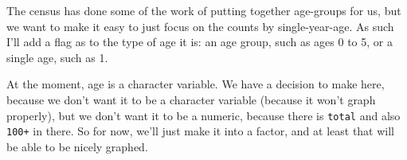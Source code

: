 \documentclass[
]{book}
\newenvironment{Shaded}{\begin{snugshade}}{\end{snugshade}}
\newcommand{\CommentTok}[1]{\textcolor[rgb]{0.56,0.35,0.01}{\textit{#1}}}
\newcommand{\KeywordTok}[1]{\textcolor[rgb]{0.13,0.29,0.53}{\textbf{#1}}}
\newcommand{\NormalTok}[1]{#1}
\newcommand{\OperatorTok}[1]{\textcolor[rgb]{0.81,0.36,0.00}{\textbf{#1}}}
\newcommand{\StringTok}[1]{\textcolor[rgb]{0.31,0.60,0.02}{#1}}
\begin{document}
\begin{Shaded}
\end{Shaded}

The census has done some of the work of putting together age-groups for us, but we want to make it easy to just focus on the counts by single-year-age. As such I'll add a flag as to the type of age it is: an age group, such as ages 0 to 5, or a single age, such as 1.

\begin{Shaded}
\end{Shaded}

At the moment, age is a character variable. We have a decision to make here, because we don't want it to be a character variable (because it won't graph properly), but we don't want it to be a numeric, because there is \texttt{total} and also \texttt{100+} in there. So for now, we'll just make it into a factor, and at least that will be able to be nicely graphed.
\end{document}
